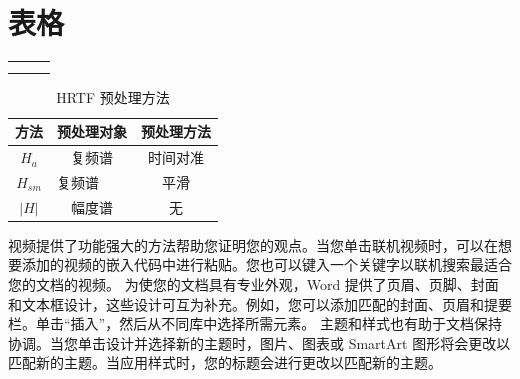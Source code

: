 \section{表格}
\begin{tabular}{ccc}
	&  &  \\
	&  &  \\
\end{tabular}
\begin{table}[H]
\caption{HRTF 预处理方法}
\centering
\begin{tabular}{|c|c|c|}
\hline
方法 & 预处理对象 & 预处理方法 \\
\hline
$H_{a}$ & 复频谱 & 时间对准 \\
$H_{s m}$ & \multicolumn{1}{l|}{复频谱} & 平滑 \\
$|H|$ & 幅度谱 & 无 \\

\hline
\end{tabular}
\end{table}
视频提供了功能强大的方法帮助您证明您的观点。当您单击联机视频时，可以在想要添加的视频的嵌入代码中进行粘贴。您也可以键入一个关键字以联机搜索最适合您的文档的视频。
为使您的文档具有专业外观，Word 提供了页眉、页脚、封面和文本框设计，这些设计可互为补充。例如，您可以添加匹配的封面、页眉和提要栏。单击“插入”，然后从不同库中选择所需元素。
主题和样式也有助于文档保持协调。当您单击设计并选择新的主题时，图片、图表或 SmartArt 图形将会更改以匹配新的主题。当应用样式时，您的标题会进行更改以匹配新的主题。
